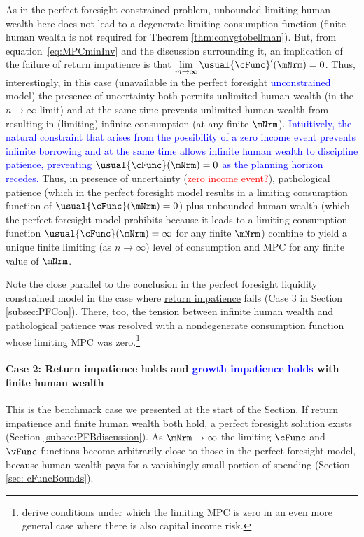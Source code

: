 \documentclass[BufferStockTheory]{subfiles}
\begin{document}
As in the perfect foresight constrained problem, unbounded limiting human wealth here does not lead to a degenerate limiting consumption function (finite human wealth is not required for Theorem \ref{thm:convgtobellman}).  But, from equation~\eqref{eq:MPCminInv} and the discussion surrounding it, an implication of the failure of \hyperlink{RIC}{return impatience} is that $\lim\limits_{m \rightarrow \infty} \usual{\cFunc}^{\prime}(\mNrm) = 0$.  Thus, interestingly, in this case (unavailable in the perfect foresight \textcolor{blue}{unconstrained} model) the presence of uncertainty both permits unlimited human wealth (in the $n\rightarrow\infty$ limit) and at the same time prevents unlimited human wealth from resulting in (limiting) infinite consumption (at any finite $\mNrm$). \textcolor{blue}{Intuitively, the natural constraint that arises from the possibility of a zero income event prevents infinite borrowing and at the same time allows infinite human wealth to discipline patience, preventing  $\usual{\cFunc}(\mNrm)=0$ as the planning horizon recedes.} Thus, in presence of uncertainty (\textcolor{red}{zero income event?}), pathological patience (which in the perfect foresight model results in a limiting consumption function of $\usual{\cFunc}(\mNrm)=0$) plus unbounded human wealth (which the perfect foresight model prohibits because it leads to a limiting consumption function $\usual{\cFunc}(\mNrm)=\infty$ for any finite $\mNrm$) combine to yield a unique finite limiting (as $n \rightarrow \infty$) level of consumption and MPC for any finite value of $\mNrm$. 

Note the close parallel to the conclusion in the perfect foresight liquidity constrained model in the case where \hyperlink{RIC}{return impatience} fails (Case 3 in Section \ref{subsec:PFCon}). There, too, the tension between infinite human wealth and pathological patience was resolved with a nondegenerate consumption function whose limiting MPC was zero.\footnote{\cite{maTodaRich} derive conditions under which the limiting MPC is zero in an even more general case where there is also capital income risk.}

\hypertarget{When-the-RIC-Holds}{}
\paragraph{Case 2: Return impatience holds and \textcolor{blue}{growth impatience holds} with finite human wealth} 
This is the benchmark case we presented at the start of the Section. If \hyperlink{RIC}{return impatience}  and \hyperlink{FHWC}{finite human wealth} both hold, a perfect foresight solution exists (Section \ref{subsec:PFBdiscussion}).  As $\mNrm \rightarrow \infty$ the limiting $\cFunc$ and $\vFunc$ functions become arbitrarily close to those in the perfect foresight model, because human wealth pays for a vanishingly small portion of spending (Section \ref{sec: cFuncBounds}).
\end{document}
